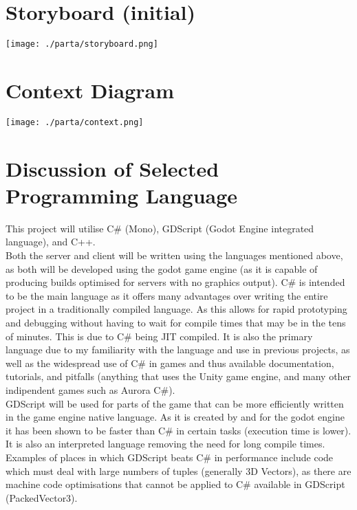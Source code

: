 \documentclass[12pt, DIV=calc]{scrartcl}
\begin{document}
\section{Storyboard (initial)}
\texttt{[image: ./parta/storyboard.png]}



\section{Context Diagram}
\texttt{[image: ./parta/context.png]}


\section{Discussion of Selected Programming Language}
This project will utilise C\# (Mono), GDScript (Godot Engine integrated language), and C++. \\

\noindent Both the server and client will be written using the languages mentioned above, as both will be developed using the godot game engine (as it is capable of producing builds optimised for servers with no graphics output). C\# is intended to be the main language as it offers many advantages over writing the entire project in a traditionally compiled language. As this allows for rapid prototyping and debugging without having to wait for compile times that may be in the tens of minutes. This is due to C\# being JIT compiled. It is also the primary language due to my familiarity with the language and use in previous projects, as well as the widespread use of C\# in games and thus available documentation, tutorials, and pitfalls (anything that uses the Unity game engine, and many other indipendent games such as Aurora C\#). \\

\noindent GDScript will be used for parts of the game that can be more efficiently written in the game engine native language. As it is created by and for the godot engine it has been shown to be faster than C\# in certain tasks (execution time is lower). It is also an interpreted language removing the need for long compile times. Examples of places in which GDScript beats C\# in performance include code which must deal with large numbers of tuples (generally 3D Vectors), as there are machine code optimisations that cannot be applied to C\# available in GDScript (PackedVector3). \\
\end{document}
